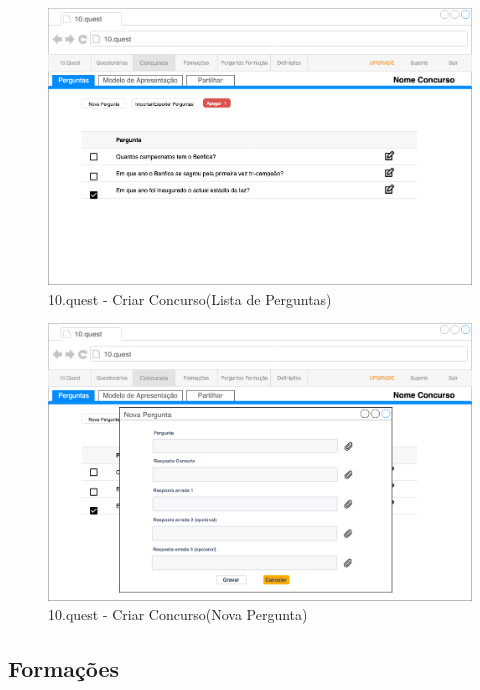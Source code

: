 \begin{figure}[ht!]
	\begin{center}
		\includegraphics[width=1\textwidth]{img/prototipos/18.png}
		\caption{10.quest - Criar Concurso(Lista de Perguntas)}
		\label{10q-}
	\end{center}
\end{figure}


\begin{figure}[ht!]
	\begin{center}
		\includegraphics[width=1\textwidth]{img/prototipos/19.png}
		\caption{10.quest - Criar Concurso(Nova Pergunta)}
		\label{10q-}
	\end{center}
\end{figure}

\newpage

\subsection{Formações}

